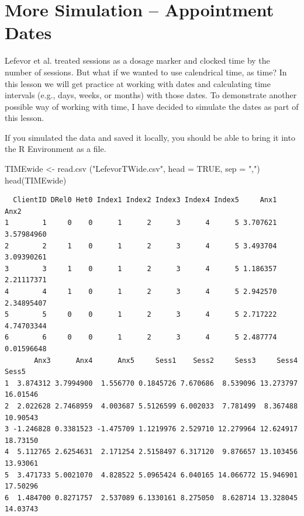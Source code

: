 \documentclass[
  11pt,
]{book}
\newenvironment{Shaded}{\begin{snugshade}}{\end{snugshade}}
\newcommand{\AttributeTok}[1]{\textcolor[rgb]{0.77,0.63,0.00}{#1}}
\newcommand{\ConstantTok}[1]{\textcolor[rgb]{0.00,0.00,0.00}{#1}}
\newcommand{\FunctionTok}[1]{\textcolor[rgb]{0.00,0.00,0.00}{#1}}
\newcommand{\NormalTok}[1]{#1}
\newcommand{\OtherTok}[1]{\textcolor[rgb]{0.56,0.35,0.01}{#1}}
\newcommand{\StringTok}[1]{\textcolor[rgb]{0.31,0.60,0.02}{#1}}
\begin{document}
\hypertarget{more-simulation-appointment-dates}{%
\section{More Simulation -- Appointment Dates}\label{more-simulation-appointment-dates}}

Lefevor et al. \citeyearpar{lefevor_religious_2017} treated sessions as a dosage marker and clocked time by the number of sessions. But what if we wanted to use calendrical time, as time? In this lesson we will get practice at working with dates and calculating time intervals (e.g., days, weeks, or months) with those dates. To demonstrate another possible way of working with time, I have decided to simulate the dates as part of this lesson.

If you simulated the data and saved it locally, you should be able to bring it into the R Environment as a file.

\begin{Shaded}
\begin{Highlighting}[]
\NormalTok{TIMEwide }\OtherTok{\textless{}{-}} \FunctionTok{read.csv}\NormalTok{ (}\StringTok{"LefevorTWide.csv"}\NormalTok{, }\AttributeTok{head =} \ConstantTok{TRUE}\NormalTok{, }\AttributeTok{sep =} \StringTok{","}\NormalTok{)}
\FunctionTok{head}\NormalTok{(TIMEwide)}
\end{Highlighting}
\end{Shaded}

\begin{verbatim}
  ClientID DRel0 Het0 Index1 Index2 Index3 Index4 Index5     Anx1       Anx2
1        1     0    0      1      2      3      4      5 3.707621 3.57984960
2        2     1    0      1      2      3      4      5 3.493704 3.09390261
3        3     1    0      1      2      3      4      5 1.186357 2.21117371
4        4     1    0      1      2      3      4      5 2.942570 2.34895407
5        5     0    0      1      2      3      4      5 2.717222 4.74703344
6        6     0    0      1      2      3      4      5 2.487774 0.01596648
       Anx3      Anx4      Anx5     Sess1    Sess2     Sess3     Sess4    Sess5
1  3.874312 3.7994900  1.556770 0.1845726 7.670686  8.539096 13.273797 16.01546
2  2.022628 2.7468959  4.003687 5.5126599 6.002033  7.781499  8.367488 10.90543
3 -1.246828 0.3381523 -1.475709 1.1219976 2.529710 12.279964 12.624917 18.73150
4  5.112765 2.6254631  2.171254 2.5158497 6.317120  9.876657 13.103456 13.93061
5  3.471733 5.0021070  4.828522 5.0965424 6.040165 14.066772 15.946901 17.50296
6  1.484700 0.8271757  2.537089 6.1330161 8.275050  8.628714 13.328045 14.03743
\end{verbatim}
\end{document}
